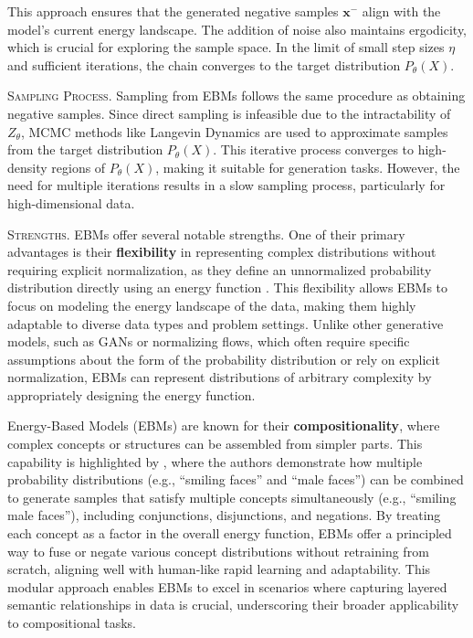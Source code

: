 This approach ensures that the generated negative samples \(\mathbf{x}^-\) align with the model's current energy landscape. The addition of noise also maintains ergodicity, which is crucial for exploring the sample space. In the limit of small step sizes \(\eta\) and sufficient iterations, the chain converges to the target distribution \(P_\theta(X)\).

\textsc{Sampling Process.} Sampling from EBMs follows the same procedure as obtaining negative samples. Since direct sampling is infeasible due to the intractability of \( Z_\theta \), MCMC methods like Langevin Dynamics are used to approximate samples from the target distribution \( P_\theta(X) \). This iterative process converges to high-density regions of \( P_\theta(X) \), making it suitable for generation tasks. However, the need for multiple iterations results in a slow sampling process, particularly for high-dimensional data.

\textsc{Strengths.} EBMs offer several notable strengths. One of their primary advantages is their \textbf{flexibility} in representing complex distributions without requiring explicit normalization, as they define an unnormalized probability distribution directly using an energy function \cite{lecun2006tutorial}. This flexibility allows EBMs to focus on modeling the energy landscape of the data, making them highly adaptable to diverse data types and problem settings. Unlike other generative models, such as GANs or normalizing flows, which often require specific assumptions about the form of the probability distribution or rely on explicit normalization, EBMs can represent distributions of arbitrary complexity by appropriately designing the energy function.

Energy-Based Models (EBMs) are known for their \textbf{compositionality}, where complex concepts or structures can be assembled from simpler parts. This capability is highlighted by \citet{du2020compositional}, where the authors demonstrate how multiple probability distributions (e.g., ``smiling faces'' and ``male faces'') can be combined to generate samples that satisfy multiple concepts simultaneously (e.g., ``smiling male faces''), including conjunctions, disjunctions, and negations. By treating each concept as a factor in the overall energy function, EBMs offer a principled way to fuse or negate various concept distributions without retraining from scratch, aligning well with human-like rapid learning and adaptability. This modular approach enables EBMs to excel in scenarios where capturing layered semantic relationships in data is crucial, underscoring their broader applicability to compositional tasks.


